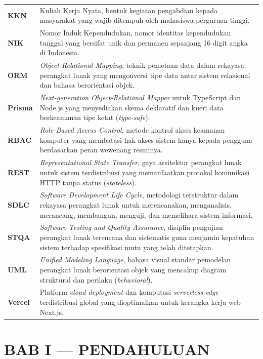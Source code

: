 \documentclass[
  indonesian,
  12pt,
]{report}
\begin{document}
{\begin{longtable}[]{@{}
  >{\raggedright\arraybackslash}p{}
  >{\raggedright\arraybackslash}p{}@{}}
\textbf{KKN} & Kuliah Kerja Nyata, bentuk kegiatan pengabdian kepada
masyarakat yang wajib ditempuh oleh mahasiswa perguruan tinggi. \\
\textbf{NIK} & Nomor Induk Kependudukan, nomor identitas kependudukan
tunggal yang bersifat unik dan permanen sepanjang 16 digit angka di
Indonesia. \\
\textbf{ORM} & \emph{Object-Relational Mapping}, teknik pemetaan data
dalam rekayasa perangkat lunak yang mengonversi tipe data antar sistem
relasional dan bahasa berorientasi objek. \\
\textbf{Prisma} & \emph{Next-generation Object-Relational Mapper} untuk
TypeScript dan Node.js yang menyediakan skema deklaratif dan kueri data
berkeamanan tipe ketat (\emph{type-safe}). \\
\textbf{RBAC} & \emph{Role-Based Access Control}, metode kontrol akses
keamanan komputer yang membatasi hak akses sistem hanya kepada pengguna
berdasarkan peran wewenang resminya. \\
\textbf{REST} & \emph{Representational State Transfer}, gaya arsitektur
perangkat lunak untuk sistem terdistribusi yang memanfaatkan protokol
komunikasi HTTP tanpa status (\emph{stateless}). \\
\textbf{SDLC} & \emph{Software Development Life Cycle}, metodologi
terstruktur dalam rekayasa perangkat lunak untuk merencanakan,
menganalisis, merancang, membangun, menguji, dan memelihara sistem
informasi. \\
\textbf{STQA} & \emph{Software Testing and Quality Assurance}, disiplin
pengujian perangkat lunak terencana dan sistematis guna menjamin
kepatuhan sistem terhadap spesifikasi mutu yang telah ditetapkan. \\
\textbf{UML} & \emph{Unified Modeling Language}, bahasa visual standar
pemodelan perangkat lunak berorientasi objek yang mencakup diagram
struktural dan perilaku (\emph{behavioral}). \\
\textbf{Vercel} & Platform \emph{cloud deployment} dan komputasi
\emph{serverless edge} terdistribusi global yang dioptimalkan untuk
kerangka kerja web Next.js. \\
\end{longtable}
}

\newpage

\chapter{BAB I --- PENDAHULUAN}\label{bab-i-pendahuluan}
\end{document}

